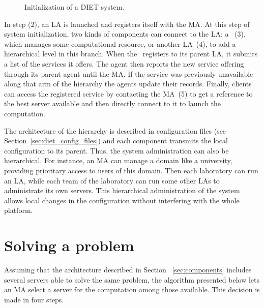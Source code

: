 \begin{figure}[hbt]
  \begin{center}
    \caption{Initialization of a DIET system.}
    \label{fig:init}
  \end{center}
\end{figure}

In step (2), an LA is launched and registers itself with the MA.
At this step of system initialization, two kinds of components can
connect to
the LA: a \sed ~(3), which manages some computational resource, or
another LA~(4), to add a hierarchical level in this branch. When the
\sed\ registers to its parent LA, it submits a list of the services it
offers.  The agent then reports the new service offering through its
parent agent until the MA.  If the service was previously unavailable
along that arm of the hierarchy the agents update their records.
Finally, clients can access the registered service by contacting
the MA~(5) to get a reference to the best server available and then
directly connect to it to launch the computation.

The architecture of the hierarchy is described in configuration files
(see Section~\ref{sec:diet_config_files})
and each component transmits the local configuration to its
parent. Thus, the system administration can also be hierarchical. For
instance, an MA can manage a domain like a university, providing
prioritary access to users of this domain. Then each laboratory can
run an LA, while each team of the laboratory can run some other LAs to
administrate its own servers. This hierarchical administration of the
system allows local changes in the configuration without interfering
with the whole platform.



\section{Solving a problem}
\label{sec:solvepb}

Assuming that the architecture described in Section
~\ref{sec:components} includes several servers able to solve the
same problem, the algorithm presented below lets an MA select a
server for the computation among those available. This decision is
made in four steps.




